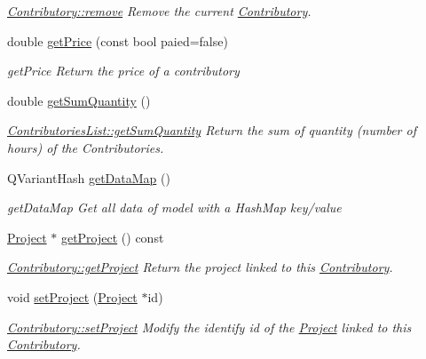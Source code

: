 \begin{DoxyCompactItemize}
\begin{DoxyCompactList}\small\item\em \hyperlink{classModels_1_1Contributory_ab9971d7867516b488095e63e1179eac8}{Contributory\-::remove} Remove the current \hyperlink{classModels_1_1Contributory}{Contributory}. \end{DoxyCompactList}\item 
double \hyperlink{classModels_1_1Contributory_ac8eb5c2589dd05bba5b51ac190ecd778}{get\-Price} (const bool paied=false)
\begin{DoxyCompactList}\small\item\em get\-Price Return the price of a contributory \end{DoxyCompactList}\item 
double \hyperlink{classModels_1_1Contributory_aa6f3e9018846a83d192b8fb427fe0481}{get\-Sum\-Quantity} ()
\begin{DoxyCompactList}\small\item\em \hyperlink{classModels_1_1ContributoriesList_af9b3b1b703cebeef552d058999ffcc4c}{Contributories\-List\-::get\-Sum\-Quantity} Return the sum of quantity (number of hours) of the Contributories. \end{DoxyCompactList}\item 
Q\-Variant\-Hash \hyperlink{classModels_1_1Contributory_a692f563f0428866441ea8bc2b9e772ca}{get\-Data\-Map} ()
\begin{DoxyCompactList}\small\item\em get\-Data\-Map Get all data of model with a Hash\-Map key/value \end{DoxyCompactList}\item 
\hyperlink{classModels_1_1Project}{Project} $\ast$ \hyperlink{classModels_1_1Contributory_a49379aeb4de2376d5a2aaf10f54daf05}{get\-Project} () const 
\begin{DoxyCompactList}\small\item\em \hyperlink{classModels_1_1Contributory_a49379aeb4de2376d5a2aaf10f54daf05}{Contributory\-::get\-Project} Return the project linked to this \hyperlink{classModels_1_1Contributory}{Contributory}. \end{DoxyCompactList}\item 
void \hyperlink{classModels_1_1Contributory_a4478894daf317068856b707491d03555}{set\-Project} (\hyperlink{classModels_1_1Project}{Project} $\ast$id)
\begin{DoxyCompactList}\small\item\em \hyperlink{classModels_1_1Contributory_a4478894daf317068856b707491d03555}{Contributory\-::set\-Project} Modify the identify {\itshape id} of the \hyperlink{classModels_1_1Project}{Project} linked to this \hyperlink{classModels_1_1Contributory}{Contributory}. \end{DoxyCompactList}\item 

\end{DoxyCompactItemize}

